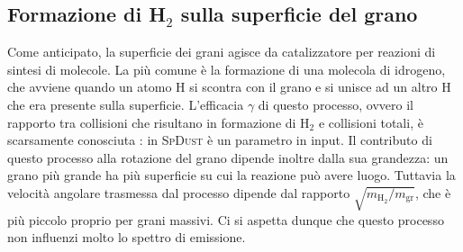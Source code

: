 \subsection{Formazione di H$_2$ sulla superficie del grano}

Come anticipato, la superficie dei grani agisce da catalizzatore per reazioni di sintesi di molecole. La più comune è la formazione di una molecola di idrogeno, che avviene quando un atomo H si scontra con il grano e si unisce ad un altro H che era presente sulla superficie. L'efficacia $\gamma$ di questo processo, ovvero il rapporto tra collisioni che risultano in formazione di H$_2$ e collisioni totali, è scarsamente conosciuta \parencite[166]{DL98b}: in \textsc{SpDust} è un parametro in input. Il contributo di questo processo alla rotazione del grano dipende inoltre dalla sua grandezza: un grano più grande ha più superficie su cui la reazione può avere luogo. Tuttavia la velocità angolare trasmessa dal processo dipende dal rapporto $\sqrt{m_{\mathrm{H}_2}/m_{\mathrm{gr}}}$, che è più piccolo proprio per grani massivi. Ci si aspetta dunque che questo processo non influenzi molto lo spettro di emissione.